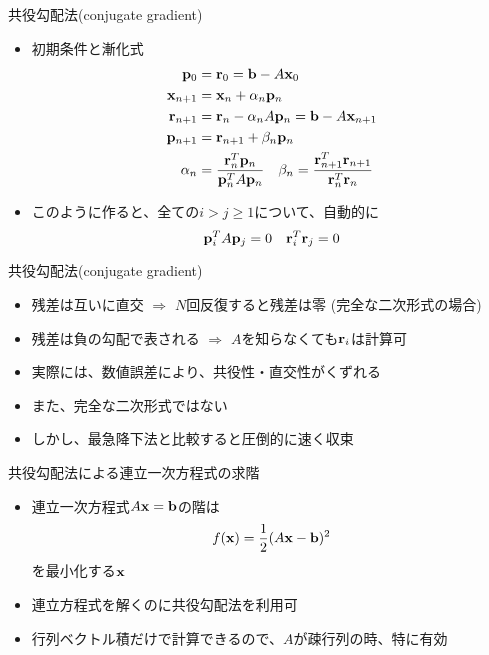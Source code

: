 \begin{frame}[t,fragile]{共役勾配法(conjugate gradient)}
  \begin{itemize}
    \setlength{\itemsep}{1em}
  \item 初期条件と漸化式
    \begin{align*}
      {\bf p}_0 &= {\bf r}_0 = {\bf b} - A {\bf x}_0 \\
      {\bf x}_{n+1} &= {\bf x}_n + \alpha_n {\bf p}_n \\
      {\bf r}_{n+1} &= {\bf r}_n - \alpha_n A {\bf p}_n = {\bf b} - A {\bf x}_{n+1} \\
      {\bf p}_{n+1} &= {\bf r}_{n+1} + \beta_n {\bf p}_n \\
      \alpha_n &= \frac{{\bf r}_n^T {\bf p}_n}{{\bf p}_n^T A {\bf p}_n} \ \ \
      \beta_n = \frac{{\bf r}_{n+1}^T {\bf r}_{n+1}}{{\bf r}_n^T {\bf r}_n}
    \end{align*}
  \item このように作ると、全ての$i>j \ge 1$について、自動的に
    \[
      {\bf p}_i^T A {\bf p}_j = 0 \ \ \ {\bf r}_i^T {\bf r}_j = 0
      \]
  \end{itemize}
\end{frame}

\begin{frame}[t,fragile]{共役勾配法(conjugate gradient)}
  \begin{itemize}
    \setlength{\itemsep}{1em}
  \item 残差は互いに直交 $\Rightarrow$ $N$回反復すると残差は零 (完全な二次形式の場合)
  \item 残差は負の勾配で表される $\Rightarrow$ $A$を知らなくても${\bf r}_i$は計算可
  \item 実際には、数値誤差により、共役性・直交性がくずれる
  \item また、完全な二次形式ではない
  \item しかし、最急降下法と比較すると圧倒的に速く収束
  \end{itemize}
\end{frame}

\begin{frame}[t,fragile]{共役勾配法による連立一次方程式の求階}
  \begin{itemize}
    \setlength{\itemsep}{1em}
  \item 連立一次方程式$A{\bf x} = {\bf b}$の階は
    \[
    f({\bf x}) = \frac{1}{2} (A {\bf x} - {\bf b})^2
    \]
    を最小化する${\bf x}$
  \item 連立方程式を解くのに共役勾配法を利用可
  \item 行列ベクトル積だけで計算できるので、$A$が疎行列の時、特に有効
  \end{itemize}
\end{frame}

